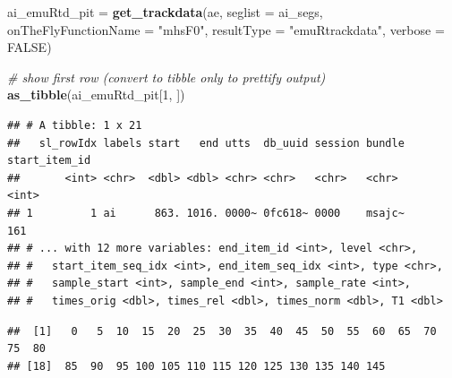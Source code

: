 \documentclass[]{book}
\newenvironment{Shaded}{\begin{snugshade}}{\end{snugshade}}
\newcommand{\CommentTok}[1]{\textcolor[rgb]{0.56,0.35,0.01}{\textit{#1}}}
\newcommand{\DataTypeTok}[1]{\textcolor[rgb]{0.13,0.29,0.53}{#1}}
\newcommand{\DecValTok}[1]{\textcolor[rgb]{0.00,0.00,0.81}{#1}}
\newcommand{\KeywordTok}[1]{\textcolor[rgb]{0.13,0.29,0.53}{\textbf{#1}}}
\newcommand{\NormalTok}[1]{#1}
\newcommand{\OperatorTok}[1]{\textcolor[rgb]{0.81,0.36,0.00}{\textbf{#1}}}
\newcommand{\OtherTok}[1]{\textcolor[rgb]{0.56,0.35,0.01}{#1}}
\newcommand{\StringTok}[1]{\textcolor[rgb]{0.31,0.60,0.02}{#1}}
\begin{document}
\begin{Shaded}
\begin{Highlighting}[]
\NormalTok{ai_emuRtd_pit =}\StringTok{ }\KeywordTok{get_trackdata}\NormalTok{(ae,}
                              \DataTypeTok{seglist =}\NormalTok{ ai_segs,}
                              \DataTypeTok{onTheFlyFunctionName =} \StringTok{"mhsF0"}\NormalTok{,}
                              \DataTypeTok{resultType =} \StringTok{"emuRtrackdata"}\NormalTok{,}
                              \DataTypeTok{verbose =} \OtherTok{FALSE}\NormalTok{)}

\CommentTok{# show first row (convert to tibble only to prettify output)}
\KeywordTok{as_tibble}\NormalTok{(ai_emuRtd_pit[}\DecValTok{1}\NormalTok{, ])}
\end{Highlighting}
\end{Shaded}

\begin{verbatim}
## # A tibble: 1 x 21
##   sl_rowIdx labels start   end utts  db_uuid session bundle start_item_id
##       <int> <chr>  <dbl> <dbl> <chr> <chr>   <chr>   <chr>          <int>
## 1         1 ai      863. 1016. 0000~ 0fc618~ 0000    msajc~           161
## # ... with 12 more variables: end_item_id <int>, level <chr>,
## #   start_item_seq_idx <int>, end_item_seq_idx <int>, type <chr>,
## #   sample_start <int>, sample_end <int>, sample_rate <int>,
## #   times_orig <dbl>, times_rel <dbl>, times_norm <dbl>, T1 <dbl>
\end{verbatim}

\begin{Shaded}
\end{Shaded}

\begin{verbatim}
##  [1]   0   5  10  15  20  25  30  35  40  45  50  55  60  65  70  75  80
## [18]  85  90  95 100 105 110 115 120 125 130 135 140 145
\end{verbatim}

\begin{Shaded}
\end{Shaded}
\end{document}
